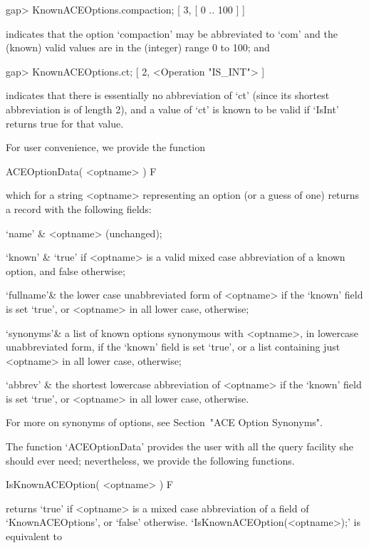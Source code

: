 \beginexample
gap> KnownACEOptions.compaction;
[ 3, [ 0 .. 100 ] ]
\endexample

indicates that the option `compaction' may be  abbreviated  to  `com'
and the (known) valid values are in the (integer) range 0 to 100; and

\beginexample
gap> KnownACEOptions.ct;
[ 2, <Operation "IS_INT"> ]
\endexample

indicates that there is essentially no abbreviation of `ct' (since its
shortest abbreviation is of length 2),  and a value of  `ct' is  known
to be valid if `IsInt' returns true for that value.

\beginitems

For user convenience, we provide the function

\>ACEOptionData( <optname> ) F

which for a string <optname> representing an {\ACE} option (or a guess
of one) returns a record with the following fields:

\beginitems

\quad`name'   & <optname> (unchanged);

\quad`known'  & `true' if <optname> is a valid mixed case abbreviation
of a known {\ACE} option, and false otherwise;

\quad`fullname'& the lower case unabbreviated form of <optname> if the
`known'  field  is  set  `true',  or  <optname>  in  all  lower  case,
otherwise;

\quad`synonyms'& a  list  of  known  {\ACE}  options  synonymous  with
<optname>, in lowercase unabbreviated form, if the  `known'  field  is
set `true', or a list containing just <optname>  in  all  lower  case,
otherwise;

\quad`abbrev' & the shortest lowercase abbreviation  of  <optname>  if
the `known' field is set `true',  or  <optname>  in  all  lower  case,
otherwise.

\enditems

For more on  synonyms  of  {\ACE}  options,  see  Section~"ACE  Option
Synonyms".

The function `ACEOptionData' provides the  user  with  all  the  query
facility she should ever need; nevertheless, we provide the  following
functions.

\>IsKnownACEOption( <optname> ) F

returns `true' if <optname> is a mixed case abbreviation of a field of
`KnownACEOptions',           or           `false'           otherwise.
`IsKnownACEOption(<optname>);'        is         equivalent         to

